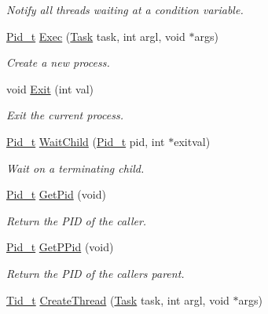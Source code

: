 \begin{DoxyCompactItemize}
\begin{DoxyCompactList}\small\item\em Notify all threads waiting at a condition variable. \end{DoxyCompactList}\item 
\hyperlink{group__syscalls_gafac07f3170763932fac97b6eab2c3984}{Pid\+\_\+t} \hyperlink{group__syscalls_ga737ad30d8105b4b76e3eb102dd016404}{Exec} (\hyperlink{group__syscalls_gaec3f2f835e105271fbbc00272c0ba984}{Task} task, int argl, void $\ast$args)
\begin{DoxyCompactList}\small\item\em Create a new process. \end{DoxyCompactList}\item 
void \hyperlink{group__syscalls_gabed0249344c12ecd4f8d440fc05a360a}{Exit} (int val)
\begin{DoxyCompactList}\small\item\em Exit the current process. \end{DoxyCompactList}\item 
\hyperlink{group__syscalls_gafac07f3170763932fac97b6eab2c3984}{Pid\+\_\+t} \hyperlink{group__syscalls_ga37017afba05480740d26b033975fef03}{Wait\+Child} (\hyperlink{group__syscalls_gafac07f3170763932fac97b6eab2c3984}{Pid\+\_\+t} pid, int $\ast$exitval)
\begin{DoxyCompactList}\small\item\em Wait on a terminating child. \end{DoxyCompactList}\item 
\hyperlink{group__syscalls_gafac07f3170763932fac97b6eab2c3984}{Pid\+\_\+t} \hyperlink{group__syscalls_ga5106ac1f078c5dde2d6fea3881c1a4fb}{Get\+Pid} (void)
\begin{DoxyCompactList}\small\item\em Return the P\+ID of the caller. \end{DoxyCompactList}\item 
\hyperlink{group__syscalls_gafac07f3170763932fac97b6eab2c3984}{Pid\+\_\+t} \hyperlink{group__syscalls_ga33ccb3f7c80d85e610206c0e1150657b}{Get\+P\+Pid} (void)
\begin{DoxyCompactList}\small\item\em Return the P\+ID of the caller\textquotesingle{}s parent. \end{DoxyCompactList}\item 
\hyperlink{group__syscalls_gaf67ad1c55e6b2a79bf8a99106380ce01}{Tid\+\_\+t} \hyperlink{group__syscalls_ga284070b5fddcc3653e146e63fcbfe6e3}{Create\+Thread} (\hyperlink{group__syscalls_gaec3f2f835e105271fbbc00272c0ba984}{Task} task, int argl, void $\ast$args)

\end{DoxyCompactItemize}
